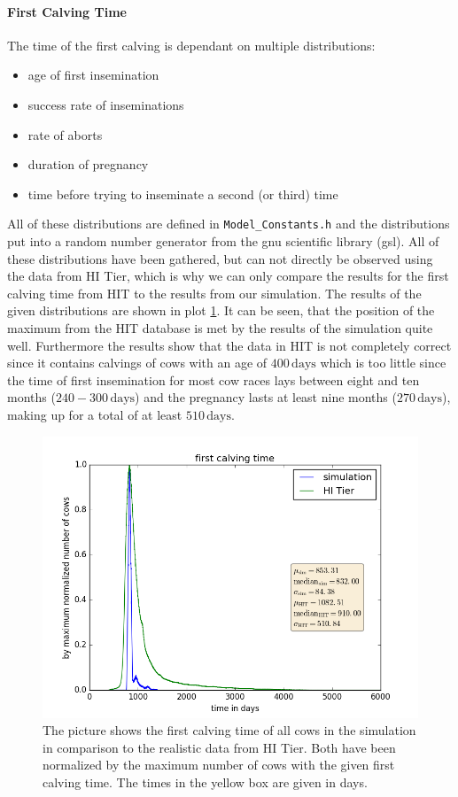\paragraph{First Calving Time}
The time of the first calving is dependant on multiple distributions:
\begin{itemize}
\item age of first insemination
\item success rate of inseminations
\item rate of aborts
\item duration of pregnancy 
\item time before trying to inseminate a second (or third) time
\end{itemize}
All of these distributions are defined in {\tt Model\_Constants.h} and the distributions put into a random number generator from the gnu scientific library (gsl). All of these distributions have been gathered, but can not directly be observed using the data from HI Tier, which is why we can only compare the results for the first calving time from HIT to the results from our simulation.
The results of the given distributions are shown in plot \ref{fig:firstCalvingTime}. 
It can be seen, that the position of the maximum from the HIT database is met by the results of the simulation quite well. Furthermore the results show that the data in HIT is not completely correct since it contains calvings of cows with an age of $400\,\text{days}$ which is too little since the time of first insemination for most cow races lays between eight and ten months ($240-300\,\text{days}$) and the pregnancy lasts at least nine months ($270\,\text{days}$), making up for a total of at least $510\,\text{days}$. 
\begin{figure}[htbp]
\centering
\noindent\includegraphics[width=0.8\linewidth,height=\textheight,
keepaspectratio]{firstCalvingTimesNormalwithCSV.png} 
\caption[First Calving Time]{The picture shows the first calving time of all cows in the simulation in comparison to the realistic data from HI Tier. Both have been normalized by the maximum number of cows with the given first calving time. The times in the yellow box are given in days.}
\label{fig:firstCalvingTime}
\end{figure}
